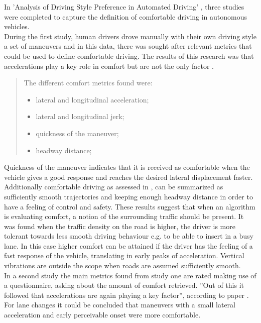 In 'Analysis of Driving Style Preference in Automated Driving' \cite{Bellem}, three studies were completed to capture the definition of comfortable driving in autonomous vehicles.\\
During the first study, human drivers drove manually with their own driving style a set of maneuvers and in this data, there was sought after relevant metrics that could be used to define comfortable driving. The results of this research was that accelerations play a key role in comfort but are not the only factor \cite{Bellem}.

\begin{quote}
	The different comfort metrics found were:
	\begin{itemize}
		\item lateral and longitudinal acceleration;
		\item lateral and longitudinal jerk;
		\item quickness of the maneuver;
		\item headway distance;
	\end{itemize}
\end{quote}

Quickness of the maneuver indicates that it is received as comfortable when the vehicle gives a good response and reaches the desired lateral displacement faster.
Additionally comfortable driving as assessed in \cite{Bellem}, can be summarized as  sufficiently smooth trajectories and keeping enough headway distance in order to have a feeling of control and safety. These results suggest that when an algorithm is evaluating comfort, a notion of the surrounding traffic should be present. It was found when the traffic density on the road is higher, the driver is more tolerant towards less smooth driving behaviour e.g. to be able to insert in a busy lane. In this case higher comfort can be attained if the driver has the feeling of a fast response of the vehicle, translating in early peaks of acceleration. Vertical vibrations are outside the scope when roads are assumed sufficiently smooth.\\

In a second study the main metrics found from study one are rated making use of a questionnaire, asking about the amount of comfort retrieved. ''Out of this it followed that accelerations are again playing a key factor'', according to paper \cite{Bellem}. For lane changes it could be concluded that maneuvers with a small lateral acceleration and early perceivable onset were more comfortable.\\

